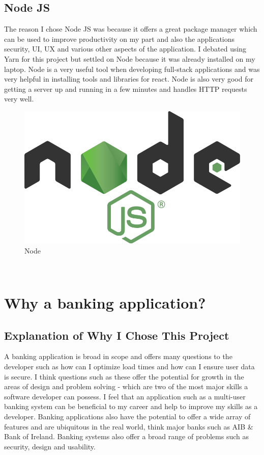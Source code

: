 \subsection{Node JS}
The reason I chose Node JS was because it offers a great package manager which can be
used to improve productivity on my part and also the applications security, UI,
UX and various other aspects of the application.  I debated using Yarn for this
project but settled on Node because it was already installed on my laptop.  Node
is a very useful tool when developing full-stack applications and was very helpful
in installing tools and libraries for react.  Node is also very good for getting a server
up and running in a few minutes and handles HTTP requests very well.
\\
\begin{figure}[h!]
  \includegraphics[width=\textwidth]{img/node.png}
  \caption{Node}
  \label{fig: Image of Node Logo}
\end{figure} \cite{NodeImage}
\\
\section{Why a banking application?}
\subsection{Explanation of Why I Chose This Project}
A banking application is broad in scope and offers many questions to the developer
such as how can I optimize load times and how can I ensure user data is secure.
I think questions such as these offer the potential for growth in the areas of
design and problem solving - which are two of the most major skills a software
developer can possess. I feel that an application such as a multi-user banking
system can be beneficial to my career and help to improve my skills as a developer.
Banking applications also have the potential to offer a wide array of features and
are ubiquitous in the real world, think major banks such as AIB \& Bank of Ireland.
Banking systems also offer a broad range of problems such as security, design
and usability.
\\
